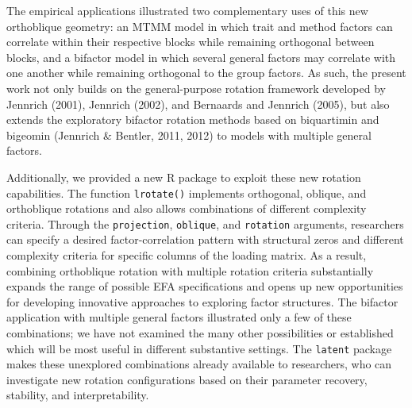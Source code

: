 \documentclass[
  12pt,
  letterpaper,
  article]{scrartcl}
\begin{document}
The empirical applications illustrated two complementary uses of this
new orthoblique geometry: an MTMM model in which trait and method
factors can correlate within their respective blocks while remaining
orthogonal between blocks, and a bifactor model in which several general
factors may correlate with one another while remaining orthogonal to the
group factors. As such, the present work not only builds on the
general-purpose rotation framework developed by Jennrich (2001),
Jennrich (2002), and Bernaards and Jennrich (2005), but also extends the
exploratory bifactor rotation methods based on biquartimin and bigeomin
(Jennrich \& Bentler, 2011, 2012) to models with multiple general
factors.

Additionally, we provided a new R package to exploit these new rotation
capabilities. The function \texttt{lrotate()} implements orthogonal,
oblique, and orthoblique rotations and also allows combinations of
different complexity criteria. Through the \texttt{projection},
\texttt{oblique}, and \texttt{rotation} arguments, researchers can
specify a desired factor-correlation pattern with structural zeros and
different complexity criteria for specific columns of the loading
matrix. As a result, combining orthoblique rotation with multiple
rotation criteria substantially expands the range of possible EFA
specifications and opens up new opportunities for developing innovative
approaches to exploring factor structures. The bifactor application with
multiple general factors illustrated only a few of these combinations;
we have not examined the many other possibilities or established which
will be most useful in different substantive settings. The
\texttt{latent} package makes these unexplored combinations already
available to researchers, who can investigate new rotation
configurations based on their parameter recovery, stability, and
interpretability.
\end{document}
